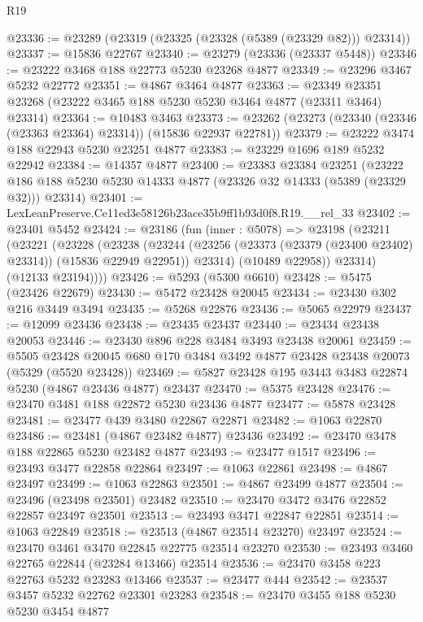 \begin{lexlean}{R19}
\begin{coremodule}
@23336 := @23289 (@23319 (@23325 (@23328 (@5389 (@23329 @82))) @23314))
@23337 := @15836 @22767
@23340 := @23279 (@23336 (@23337 @5448))
@23346 := @23222 @3468 @188 @22773 @5230 @23268 @4877
@23349 := @23296 @3467 @5232 @22772
@23351 := @4867 @3464 @4877
@23363 := @23349 @23351 @23268 (@23222 @3465 @188 @5230 @5230 @3464 @4877 (@23311 @3464) @23314)
@23364 := @10483 @3463
@23373 := @23262 (@23273 (@23340 (@23346 (@23363 @23364) @23314)) (@15836 @22937 @22781))
@23379 := @23222 @3474 @188 @22943 @5230 @23251 @4877
@23383 := @23229 @1696 @189 @5232 @22942
@23384 := @14357 @4877
@23400 := @23383
    @23384
    @23251
    (@23222 @186 @188 @5230 @5230 @14333 @4877 (@23326 @32 @14333 (@5389 (@23329 @32))) @23314)
@23401 := LexLeanPreserve.Ce11ed3e58126b23ace35b9ff1b93d0f8.R19.__rel_33
@23402 := @23401 @5452
@23424 := @23186
    (fun (inner : @5078) =>
    @23198
      (@23211
        (@23221
          (@23228
            (@23238
              (@23244
                (@23256 (@23373 (@23379 (@23400 @23402) @23314)) (@15836 @22949 @22951))
                @23314)
              (@10489 @22958))
            @23314)
          (@12133 @23194))))
@23426 := @5293 (@5300 @6610)
@23428 := @5475 (@23426 @22679)
@23430 := @5472 @23428 @20045
@23434 := @23430 @302 @216 @3449 @3494
@23435 := @5268 @22876
@23436 := @5065 @22979
@23437 := @12099 @23436
@23438 := @23435 @23437
@23440 := @23434 @23438 @20053
@23446 := @23430 @896 @228 @3484 @3493 @23438 @20061
@23459 := @5505
    @23428
    @20045
    @680
    @170
    @3484
    @3492
    @4877
    @23428
    @23438
    @20073
    (@5329 (@5520 @23428))
@23469 := @5827 @23428 @195 @3443 @3483 @22874 @5230 (@4867 @23436 @4877) @23437
@23470 := @5375 @23428
@23476 := @23470 @3481 @188 @22872 @5230 @23436 @4877
@23477 := @5878 @23428
@23481 := @23477 @439 @3480 @22867 @22871
@23482 := @1063 @22870
@23486 := @23481 (@4867 @23482 @4877) @23436
@23492 := @23470 @3478 @188 @22865 @5230 @23482 @4877
@23493 := @23477 @1517
@23496 := @23493 @3477 @22858 @22864
@23497 := @1063 @22861
@23498 := @4867 @23497
@23499 := @1063 @22863
@23501 := @4867 @23499 @4877
@23504 := @23496 (@23498 @23501) @23482
@23510 := @23470 @3472 @3476 @22852 @22857 @23497 @23501
@23513 := @23493 @3471 @22847 @22851
@23514 := @1063 @22849
@23518 := @23513 (@4867 @23514 @23270) @23497
@23524 := @23470 @3461 @3470 @22845 @22775 @23514 @23270
@23530 := @23493 @3460 @22765 @22844 (@23284 @13466) @23514
@23536 := @23470 @3458 @223 @22763 @5232 @23283 @13466
@23537 := @23477 @444
@23542 := @23537 @3457 @5232 @22762 @23301 @23283
@23548 := @23470 @3455 @188 @5230 @5230 @3454 @4877

\end{coremodule}
\end{lexlean}
